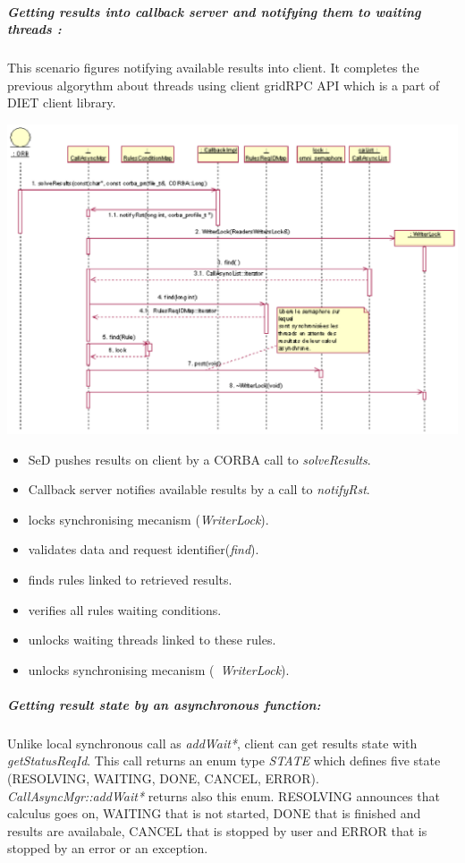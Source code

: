  \subparagraph{Getting results into callback server and notifying them to waiting threads :}
  This scenario figures notifying available results into client. It completes
  the previous algorythm about threads using client gridRPC API which is a
  part of DIET client library.

  \begin{center}
  \includegraphics{./fig/CallbackSynchronisationSequenceDiagram.ps}
  \end{center}

  \begin{itemize}
  \item SeD pushes results on client by a CORBA call to \emph{solveResults}.
  \item Callback server notifies available results by a call to \emph{notifyRst}.
  \item locks synchronising mecanism (\emph{WriterLock}).
  \item validates data and request identifier(\emph{find}).
  \item finds rules linked to retrieved results.
  \item verifies all rules waiting conditions.
  \item unlocks waiting threads linked to these rules.
  \item unlocks synchronising mecanism (\emph{~WriterLock}).
  \end{itemize}

  \subparagraph{Getting result state by an asynchronous function:}
  Unlike local synchronous call as \emph{addWait*}, client can get results
  state with \emph{getStatusReqId}. This call returns an enum type \emph{STATE}
  which defines five state (RESOLVING, WAITING, DONE, CANCEL, ERROR).
  \emph{CallAsyncMgr::addWait*} returns also this enum.
  RESOLVING announces that calculus goes on, WAITING that is not started,
  DONE that is finished and results are availabale, CANCEL that is stopped
  by user and ERROR that is stopped by an error or an exception.

